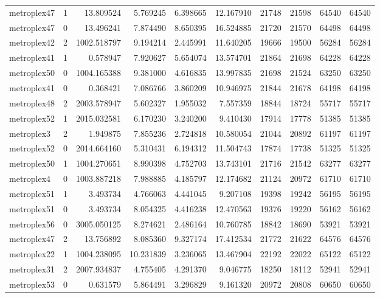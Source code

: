 \begin{longtable}{|l|r|r|r|r|r|r|r|r|r|}
metroplex47 & 1 & 13.809524 & 5.769245 & 6.398665 & 12.167910 & 21748 & 21598 & 64540 & 64540 \\
metroplex47 & 0 & 13.496241 & 7.874490 & 8.650395 & 16.524885 & 21720 & 21570 & 64498 & 64498 \\
metroplex42 & 2 & 1002.518797 & 9.194214 & 2.445991 & 11.640205 & 19666 & 19500 & 56284 & 56284 \\
metroplex41 & 1 & 0.578947 & 7.920627 & 5.654074 & 13.574701 & 21864 & 21698 & 64228 & 64228 \\
metroplex50 & 0 & 1004.165388 & 9.381000 & 4.616835 & 13.997835 & 21698 & 21524 & 63250 & 63250 \\
metroplex41 & 0 & 0.368421 & 7.086766 & 3.860209 & 10.946975 & 21844 & 21678 & 64198 & 64198 \\
metroplex48 & 2 & 2003.578947 & 5.602327 & 1.955032 & 7.557359 & 18844 & 18724 & 55717 & 55717 \\
metroplex52 & 1 & 2015.032581 & 6.170230 & 3.240200 & 9.410430 & 17914 & 17778 & 51385 & 51385 \\
metroplex3 & 2 & 1.949875 & 7.855236 & 2.724818 & 10.580054 & 21044 & 20892 & 61197 & 61197 \\
metroplex52 & 0 & 2014.664160 & 5.310431 & 6.194312 & 11.504743 & 17874 & 17738 & 51325 & 51325 \\
metroplex50 & 1 & 1004.270651 & 8.990398 & 4.752703 & 13.743101 & 21716 & 21542 & 63277 & 63277 \\
metroplex4 & 0 & 1003.887218 & 7.988885 & 4.185797 & 12.174682 & 21124 & 20972 & 61710 & 61710 \\
metroplex51 & 1 & 3.493734 & 4.766063 & 4.441045 & 9.207108 & 19398 & 19242 & 56195 & 56195 \\
metroplex51 & 0 & 3.493734 & 8.054325 & 4.416238 & 12.470563 & 19376 & 19220 & 56162 & 56162 \\
metroplex56 & 0 & 3005.050125 & 8.274621 & 2.486164 & 10.760785 & 18842 & 18690 & 53921 & 53921 \\
metroplex47 & 2 & 13.756892 & 8.085360 & 9.327174 & 17.412534 & 21772 & 21622 & 64576 & 64576 \\
metroplex22 & 1 & 1004.238095 & 10.231839 & 3.236065 & 13.467904 & 22192 & 22022 & 65122 & 65122 \\
metroplex31 & 2 & 2007.934837 & 4.755405 & 4.291370 & 9.046775 & 18250 & 18112 & 52941 & 52941 \\
metroplex53 & 0 & 0.631579 & 5.864491 & 3.296829 & 9.161320 & 20972 & 20808 & 60650 & 60650 \\

\end{longtable}
